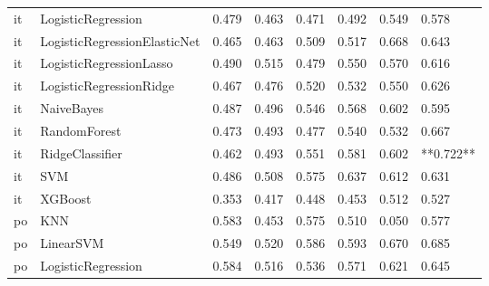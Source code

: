 \begin{tabular}{llllllll}
      it &           LogisticRegression & 0.479 &                     0.463 &                 0.471 &                  0.492 &                                   0.549 &     0.578 \\
      it & LogisticRegressionElasticNet & 0.465 &                     0.463 &                 0.509 &                  0.517 &                                   0.668 &     0.643 \\
      it &      LogisticRegressionLasso & 0.490 &                     0.515 &                 0.479 &                  0.550 &                                   0.570 &     0.616 \\
      it &      LogisticRegressionRidge & 0.467 &                     0.476 &                 0.520 &                  0.532 &                                   0.550 &     0.626 \\
      it &                   NaiveBayes & 0.487 &                     0.496 &                 0.546 &                  0.568 &                                   0.602 &     0.595 \\
      it &                 RandomForest & 0.473 &                     0.493 &                 0.477 &                  0.540 &                                   0.532 &     0.667 \\
      it &              RidgeClassifier & 0.462 &                     0.493 &                 0.551 &                  0.581 &                                   0.602 & **0.722** \\
      it &                          SVM & 0.486 &                     0.508 &                 0.575 &                  0.637 &                                   0.612 &     0.631 \\
      it &                      XGBoost & 0.353 &                     0.417 &                 0.448 &                  0.453 &                                   0.512 &     0.527 \\
      po &                          KNN & 0.583 &                     0.453 &                 0.575 &                  0.510 &                                   0.050 &     0.577 \\
      po &                    LinearSVM & 0.549 &                     0.520 &                 0.586 &                  0.593 &                                   0.670 &     0.685 \\
      po &           LogisticRegression & 0.584 &                     0.516 &                 0.536 &                  0.571 &                                   0.621 &     0.645 \\

\end{tabular}
